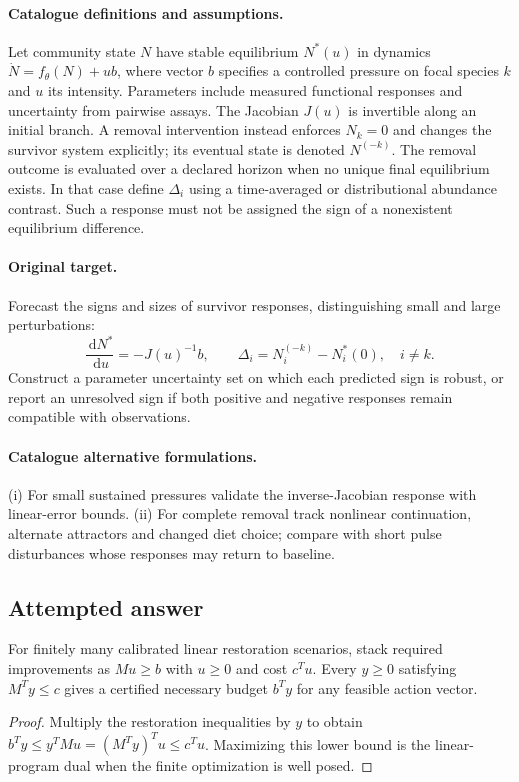 \documentclass[11pt]{article}
\begin{document}
\paragraph{Catalogue definitions and assumptions.}
Let community state $N$ have stable equilibrium $N^*(u)$ in dynamics $\dot N=f_\theta(N)+u b$, where vector $b$ specifies a controlled pressure on focal species $k$ and $u$ its intensity. Parameters include measured functional responses and uncertainty from pairwise assays. The Jacobian $J(u)$ is invertible along an initial branch. A removal intervention instead enforces $N_k=0$ and changes the survivor system explicitly; its eventual state is denoted $N^{(-k)}$. The removal outcome is evaluated over a declared horizon when no unique final equilibrium exists. In that case define $\Delta_i$ using a time-averaged or distributional abundance contrast. Such a response must not be assigned the sign of a nonexistent equilibrium difference.
\paragraph{Original target.}
Forecast the signs and sizes of survivor responses, distinguishing small and large perturbations:
\[
 \frac{\,\mathrm{d} N^*}{\,\mathrm{d} u}=-J(u)^{-1}b,
 \qquad
 \Delta_i=N_i^{(-k)}-N_i^*(0),\quad i\ne k.
\]
Construct a parameter uncertainty set on which each predicted sign is robust, or report an unresolved sign if both positive and negative responses remain compatible with observations.
\paragraph{Catalogue alternative formulations.}
(i) For small sustained pressures validate the inverse-Jacobian response with linear-error bounds. (ii) For complete removal track nonlinear continuation, alternate attractors and changed diet choice; compare with short pulse disturbances whose responses may return to baseline.
\subsection{Attempted answer}
\begin{proposition}
For finitely many calibrated linear restoration scenarios, stack required improvements as $Mu\geq b$ with $u\geq0$ and cost $c^Tu$. Every $y\geq0$ satisfying $M^Ty\leq c$ gives a certified necessary budget $b^Ty$ for any feasible action vector.
\end{proposition}
\begin{proof}
Multiply the restoration inequalities by $y$ to obtain $b^Ty\leq y^TMu=(M^Ty)^Tu\leq c^Tu$. Maximizing this lower bound is the linear-program dual when the finite optimization is well posed.
\end{proof}
\end{document}
